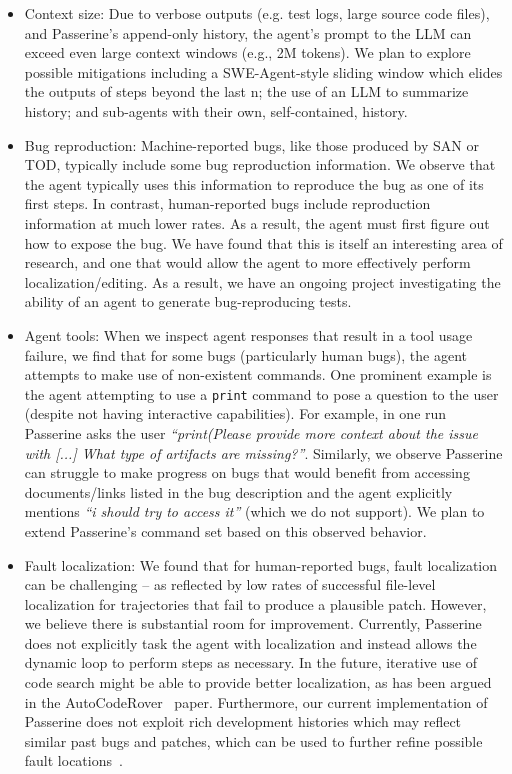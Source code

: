 \begin{itemize}
    \item Context size: Due to verbose outputs (e.g. test logs, large source code files), and Passerine’s append-only history, the agent’s prompt to the LLM can exceed even large context windows (e.g., 2M tokens).
    We plan to explore possible mitigations including a SWE-Agent-style sliding window which elides the outputs of steps beyond the last n; the use of an LLM to summarize history; and sub-agents with their own, self-contained, history.

    
    \item Bug reproduction: Machine-reported bugs, like those produced by SAN or TOD, typically include some bug reproduction information. We observe that the agent typically uses this information to reproduce the bug as one of its first steps. In contrast, human-reported bugs include reproduction information at much lower rates. As a result, the agent must first figure out how to expose the bug. We have found that this is itself an interesting area of research, and one that would allow the agent to more effectively perform localization/editing. As a result, we have an ongoing project investigating the ability of an agent to generate bug-reproducing tests.
    
    \item Agent tools: 
    When we inspect agent responses that result in a tool usage failure, we find that for some bugs (particularly
    human bugs), the agent attempts to make use of non-existent commands. One prominent example is
    the agent attempting to use a \texttt{print} command to pose a question to the user
    (despite not having interactive capabilities). For example, in one run Passerine asks
    the user \emph{``print(Please provide more context about the issue with [...] What type of artifacts are missing?''}. Similarly, we observe Passerine can struggle to make progress
    on bugs that would benefit from 
    accessing documents/links listed
    in the bug description and the agent explicitly mentions 
    \emph{``i should try to access it''} (which we do not support).  We plan to extend Passerine's command set
    based on this observed behavior.

    \item Fault localization: We found that for human-reported bugs, fault localization can be challenging -- as reflected by low rates of successful file-level localization
    for trajectories that fail to produce a plausible patch. However, we believe
    there is substantial room for improvement. Currently, Passerine does not explicitly
    task the agent with localization and instead allows the dynamic loop to 
    perform steps as necessary.  In the future, iterative use of code search might be able to provide better localization, as has been argued in the AutoCodeRover~\cite{autocoderover} paper. Furthermore, our
    current implementation of Passerine does not exploit rich development histories
    which may reflect similar past bugs and patches, which can be used
    to further refine possible fault locations~.
    

\end{itemize}
